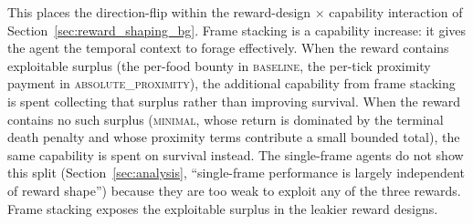 \documentclass[12pt,a4paper,titlepage]{article}
\begin{document}
This places the direction-flip within the reward-design $\times$ capability interaction of Section~\ref{sec:reward_shaping_bg}. Frame stacking is a capability increase: it gives the agent the temporal context to forage effectively. When the reward contains exploitable surplus (the per-food bounty in \textsc{baseline}, the per-tick proximity payment in \textsc{absolute\_proximity}), the additional capability from frame stacking is spent collecting that surplus rather than improving survival. When the reward contains no such surplus (\textsc{minimal}, whose return is dominated by the terminal death penalty and whose proximity terms contribute a small bounded total), the same capability is spent on survival instead. The single-frame agents do not show this split (Section~\ref{sec:analysis}, ``single-frame performance is largely independent of reward shape'') because they are too weak to exploit any of the three rewards. Frame stacking exposes the exploitable surplus in the leakier reward designs.
\end{document}
